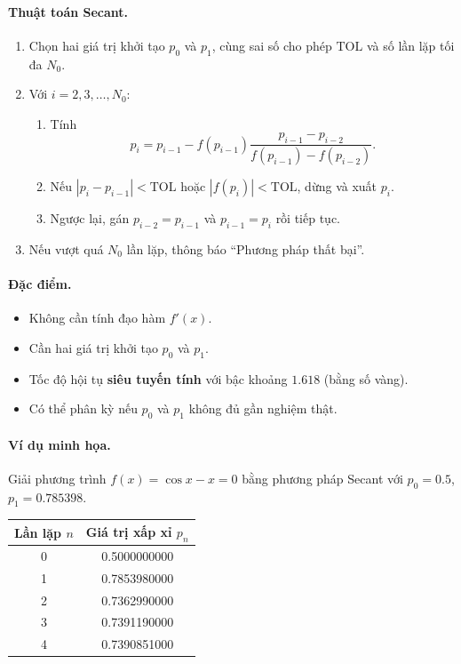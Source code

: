 \paragraph*{Thuật toán Secant.}
\begin{enumerate}
    \item Chọn hai giá trị khởi tạo $p_0$ và $p_1$, cùng sai số cho phép $\text{TOL}$ và số lần lặp tối đa $N_0$.
    \item Với $i = 2, 3, \ldots, N_0$:
    \begin{enumerate}
        \item Tính
        \[
            p_i = p_{i-1} - f(p_{i-1})
            \frac{p_{i-1} - p_{i-2}}{f(p_{i-1}) - f(p_{i-2})}.
        \]
        \item Nếu $|p_i - p_{i-1}| < \text{TOL}$ hoặc $|f(p_i)| < \text{TOL}$, dừng và xuất $p_i$.
        \item Ngược lại, gán $p_{i-2} = p_{i-1}$ và $p_{i-1} = p_i$ rồi tiếp tục.
    \end{enumerate}
    \item Nếu vượt quá $N_0$ lần lặp, thông báo “Phương pháp thất bại”.
\end{enumerate}

\paragraph*{Đặc điểm.}
\begin{itemize}
    \item Không cần tính đạo hàm $f'(x)$.
    \item Cần hai giá trị khởi tạo $p_0$ và $p_1$.
    \item Tốc độ hội tụ \textbf{siêu tuyến tính} với bậc khoảng $1.618$ (bằng số vàng).
    \item Có thể phân kỳ nếu $p_0$ và $p_1$ không đủ gần nghiệm thật.
\end{itemize}

\paragraph*{Ví dụ minh họa.}
Giải phương trình $f(x) = \cos x - x = 0$ bằng phương pháp Secant 
với $p_0 = 0.5$, $p_1 = 0.785398$.

\begin{center}
\begin{tabular}{|c|c|}
\hline
\textbf{Lần lặp} $n$ & \textbf{Giá trị xấp xỉ} $p_n$ \\
\hline
0 & 0.5000000000 \\
1 & 0.7853980000 \\
2 & 0.7362990000 \\
3 & 0.7391190000 \\
4 & 0.7390851000 \\
\hline
\end{tabular}
\end{center}

